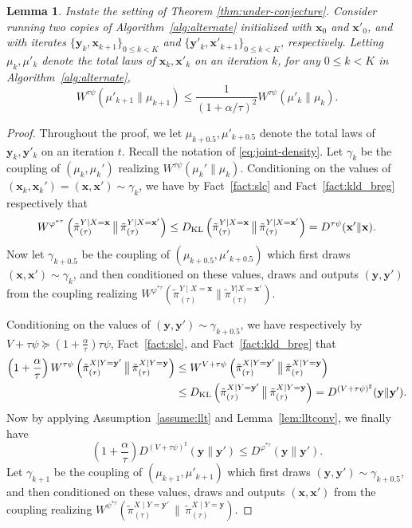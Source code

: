 \documentclass[11pt]{article}
\newtheorem{lemma}{Lemma}
\newcommand{\Par}[1]{\left(#1\right)}
\newcommand{\0}{\mathbf{0}}
\newcommand{\1}{\mathbf{1}}
\newcommand{\vx}{\mathbf{x}}
\newcommand{\vy}{\mathbf{y}}
\newcommand{\vhi}{\varphi}
\newcommand{\dkl}{D_{\textup{KL}}}
\newcommand{\tpi}{\tilde{\pi}}
\begin{document}
\begin{lemma}\label{lem:w_psi_contraction}
    Instate the setting of Theorem \ref{thm:under-conjecture}.  Consider running two copies of Algorithm~\ref{alg:alternate} initialized with $\vx_0$ and $\vx'_0$, and with iterates $\{\vy_k, \vx_{k + 1}\}_{0 \le k < K}$ and $\{\vy'_k, \vx'_{k + 1}\}_{0 \le k < K}$, respectively.
Letting $\mu_{k}, \mu'_k$ denote the total laws of $\vx_k, \vx'_k$ on an iteration $k$, for any $0 \le k < K$ in Algorithm~\ref{alg:alternate},
\[W^{\tau\psi}(\mu'_{k + 1} \| \mu_{k + 1})  \le \frac{1}{(1+\alpha/\tau)^2}W^{\tau\psi}(\mu'_k \| \mu_k). \]
\end{lemma}
\begin{proof}
Throughout the proof, we let $\mu_{k + 0.5}, \mu'_{k + 0.5}$ denote the total laws of $\vy_k, \vy'_k$ on an iteration $t$. 
Recall the notation of \eqref{eq:joint-density}.  Let $\gamma_k$ be the coupling of $(\mu_k, \mu_k')$ realizing $W^{\tau\psi}(\mu_k' \| \mu_k)$. Conditioning on the values of $(\vx_k, \vx_k') = (\vx, \vx') \sim \gamma_k$, we have by Fact~\ref{fact:slc} and Fact~\ref{fact:kld_breg} respectively that
\begin{equation}\label{eq:ystep}
W^{\vhi^{*\tau}}\Par{\tpi_{(\tau)}^{Y\mid X=\vx} \,\big\|\, \tpi_{(\tau)}^{Y\mid X=\vx'}} \le \dkl\Par{\tpi_{(\tau)}^{Y\mid X=\vx} \,\big\|\, \tpi_{(\tau)}^{Y\mid X=\vx'}} = D^{\tau\psi}(\vx' \| \vx).
\end{equation}
Now let $\gamma_{k + 0.5}$ be the coupling of $(\mu_{k + 0.5}, \mu'_{k + 0.5})$ which first draws $(\vx, \vx') \sim \gamma_k$, and then conditioned on these values, draws and outputs $(\vy, \vy')$ from the coupling realizing $W^{\vhi^{*\tau}}(\tpi_{(\tau)}^{Y \mid X = \vx} \| \tpi_{(\tau)}^{Y|X=\vx'})$. 

Conditioning on the values of $(\vy, \vy') \sim \gamma_{k + 0.5}$, we have respectively by $V+\tau\psi\succeq (1+\frac\alpha\tau)\tau\psi$, Fact~\ref{fact:slc}, and Fact~\ref{fact:kld_breg} that
\begin{equation}\label{eq:firstpart_x}
\begin{aligned}
\Par{1 + \frac \alpha \tau}W^{\tau\psi}\Par{\tpi_{(\tau)}^{X\mid Y=\vy'} \,\big\|\, \tpi_{(\tau)}^{X\mid Y=\vy}} &\le W^{V + \tau\psi}\Par{\tpi_{(\tau)}^{X\mid Y=\vy'} \,\big\|\, \tpi_{(\tau)}^{X\mid Y=\vy}} \\
    &\le \dkl\Par{\tpi_{(\tau)}^{X\mid Y=\vy'} \,\big\|\, \tpi_{(\tau)}^{X\mid Y=\vy}} = D^{(V + \tau\psi)^\sharp}(\vy \| \vy').
\end{aligned}
\end{equation}
Now by applying Assumption~\ref{assume:llt} and Lemma~\ref{lem:lltconv}, we finally have
\begin{equation}\label{eq:secondpart_x}
\Par{1 + \frac \alpha \tau}D^{(V + \tau\psi)^\sharp}(\vy \| \vy') \le D^{\vhi^{*\tau}}(\vy \| \vy').
\end{equation}
Let $\gamma_{k + 1}$ be the coupling of $(\mu_{k + 1}, \mu'_{k + 1})$ which first draws $(\vy, \vy') \sim \gamma_{k + 0.5}$, and then conditioned on these values, draws and outputs $(\vx, \vx')$ from the coupling realizing $W^{\psi^{*\tau}}(\tpi_{(\tau)}^{X\mid Y=\vy'} \,\big\|\, \tpi_{(\tau)}^{X\mid Y=\vy})$. 


\end{proof}
\end{document}
